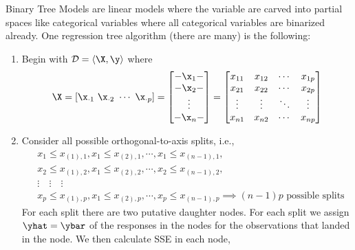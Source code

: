 \documentclass[12pt]{article}
\begin{document}
\begin{enumerate}
\end{enumerate}


\newpage

\begin{enumerate}

\begin{tcolorbox}[colback=white, sharp corners]
Binary Tree Models are linear models where the variable are carved into partial spaces like categorical variables where all categorical variables are binarized already. One regression tree algorithm (there are many) is the following:
\begin{enumerate}
\item[\#1:] Begin with $\mathcal{D} = \langle \X, \y \rangle $ where 
\[
 \X = [\x_{\cdot 1} ~ \x_{\cdot 2} ~ \cdots ~ \x_{\cdot p}] = \begin{bmatrix} -\x_1- \\ -\x_2- \\ \vdots \\ -\x_n-
 \end{bmatrix} = 
 \begin{bmatrix}
 x_{11} & x_{12} & \cdots & x_{1p}\\
 x_{21} & x_{22} & \cdots & x_{2p}\\
 \vdots & \vdots & \ddots & \vdots\\
 x_{n1} & x_{n2} & \cdots & x_{np}
 \end{bmatrix}
 \]
\item[\#2:] Consider all possible orthogonal-to-axis splits, i.e., 
\begin{align*}
	&x_1 \leq x_{(1),1},  x_1 \leq x_{(2),1}, \cdots, x_1 \leq x_{(n-1),1}, \\
	&x_2 \leq x_{(1),2},  x_1 \leq x_{(2),2}, \cdots, x_2 \leq x_{(n-1),2}, \\
	& \vdots \quad \vdots \quad \vdots\\
	&x_p \leq x_{(1),p},  x_1 \leq x_{(2),p}, \cdots, x_p \leq x_{(n-1),p} \implies (n-1)p \text{ possible splits}
\end{align*}
For each split there are two putative daughter nodes. For each split we assign $\yhat = \ybar$ of the responses in the nodes for the observations that landed in the node. We then calculate SSE in each node, 

\end{enumerate}
\end{tcolorbox}
\end{enumerate}
\end{document}
